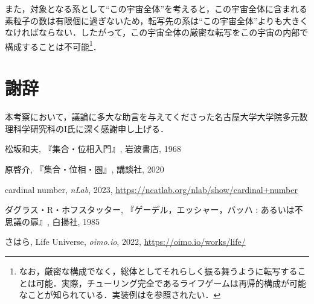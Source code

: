 \documentclass[10pt, a5paper, twoside]{jsarticle}
\theoremstyle{definition}
\begin{document}
		また，対象となる系として“この宇宙全体”を考えると，この宇宙全体に含まれる素粒子の数は有限個に過ぎないため，転写先の系は“この宇宙全体”よりも大きくなければならない．したがって，この宇宙全体の厳密な転写をこの宇宙の内部で構成することは不可能\footnote{なお，厳密な構成でなく，総体としてそれらしく振る舞うように転写することは可能．実際，チューリング完全であるライフゲームは再帰的構成が可能なことが知られている．実装例は\cite{shr}を参照されたい．}．

	\section{謝辞}

		本考察において，議論に多大な助言を与えてくださった名古屋大学大学院多元数理科学研究科のI氏に深く感謝申し上げる．

	\begin{thebibliography}{99}

		 松坂和夫, 『集合・位相入門』, 岩波書店, 1968

		 原啓介, 『集合・位相・圏』, 講談社, 2020

		 cardinal number, \textit{nLab}, 2023, \url{https://ncatlab.org/nlab/show/cardinal+number}

		 ダグラス・R・ホフスタッター, 『ゲーデル，エッシャー，バッハ : あるいは不思議の扉』, 白揚社, 1985

		 さはら, Life Universe, \textit{oimo.io}, 2022, \url{https://oimo.io/works/life/}

	\end{thebibliography}
\end{document}
